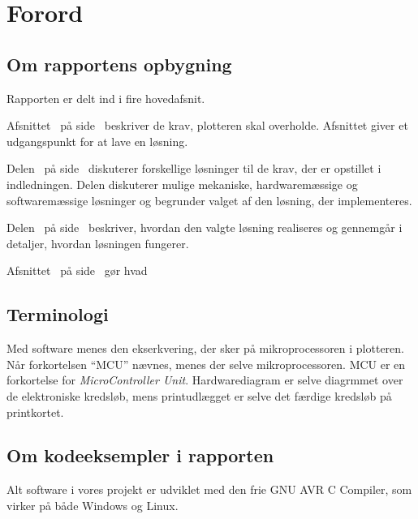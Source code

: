 \chapter{Forord}


\section{Om rapportens opbygning}

Rapporten er delt ind i fire hovedafsnit.

Afsnittet~ på side~\pageref{ch:indledning}
beskriver de krav, plotteren skal overholde. Afsnittet giver et
udgangspunkt for at lave en løsning.

Delen~ på side~\pageref{prt:design} diskuterer
forskellige løsninger til de krav, der er opstillet i
indledningen. Delen diskuterer mulige mekaniske, hardwaremæssige og
softwaremæssige løsninger og begrunder valget af den løsning, der
implementeres.

Delen~ på
side~\pageref{prt:implementering} beskriver, hvordan den valgte
løsning realiseres og gennemgår i detaljer, hvordan løsningen
fungerer.

Afsnittet~ på side~\pageref{ch:afslutning} gør
hvad


\section{Terminologi}


Med software menes den ekserkvering, der sker på mikroprocessoren i
plotteren. Når forkortelsen \enquote{MCU} nævnes, menes der selve
mikroprocessoren. MCU er en forkortelse for \textit{MicroController
  Unit}. Hardwarediagram er selve diagrmmet over de elektroniske
kredsløb, mens printudlægget er selve det færdige kredsløb på
printkortet.

\section{Om kodeeksempler i rapporten}

Alt software i vores projekt er udviklet med den frie GNU AVR C
Compiler, som virker på både Windows og Linux.


